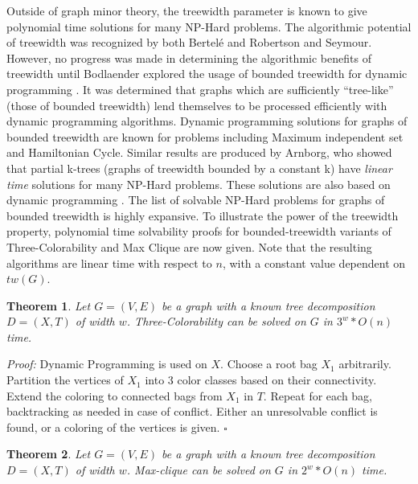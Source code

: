 \documentclass[12pt,conference]{IEEEtran}
\theoremstyle{plain}
\newtheorem{theorem}{Theorem}
\begin{document}
Outside of graph minor theory, the treewidth parameter is known to give polynomial time solutions for many NP-Hard problems. The algorithmic potential of treewidth was recognized by both Bertel\'e and Robertson and Seymour. However, no progress was made in determining the algorithmic benefits of treewidth until Bodlaender explored the usage of bounded treewidth for dynamic programming \cite{treewidth-dynamic-programming-1988}. It was determined that graphs which are sufficiently ``tree-like'' (those of bounded treewidth) lend themselves to be processed efficiently with dynamic programming algorithms. Dynamic programming solutions for graphs of bounded treewidth are known for problems including Maximum independent set and Hamiltonian Cycle. Similar results are produced by Arnborg, who showed that partial k-trees (graphs of treewidth bounded by a constant k) have \textit{linear time} solutions for many NP-Hard problems. These solutions are also based on dynamic programming \cite{arnborg-linear-treewidth-algs}. The list of solvable NP-Hard problems for graphs of bounded treewidth is highly expansive. To illustrate the power of the treewidth property, polynomial time solvability proofs for bounded-treewidth variants of Three-Colorability and Max Clique are now given. Note that the resulting algorithms are linear time with respect to $n$, with a constant value dependent on $tw(G)$.

\begin{theorem}
  Let $G=(V,E)$ be a graph with a known tree decomposition $D=(X,T)$ of width $w$. Three-Colorability can be solved on $G$ in $3^{w}*O(n)$ time.
\end{theorem}

\textit{Proof:} Dynamic Programming is used on $X$. Choose a root bag $X_{1}$ arbitrarily. Partition the vertices of $X_{1}$ into 3 color classes based on their connectivity. Extend the coloring to connected bags from $X_{1}$ in $T$. Repeat for each bag, backtracking as needed in case of conflict. Either an unresolvable conflict is found, or a coloring of the vertices is given. $\square$

\begin{theorem}
  Let $G=(V,E)$ be a graph with a known tree decomposition $D=(X,T)$ of width $w$. Max-clique can be solved on $G$ in $2^{w}*O(n)$ time.
\end{theorem}
\end{document}
